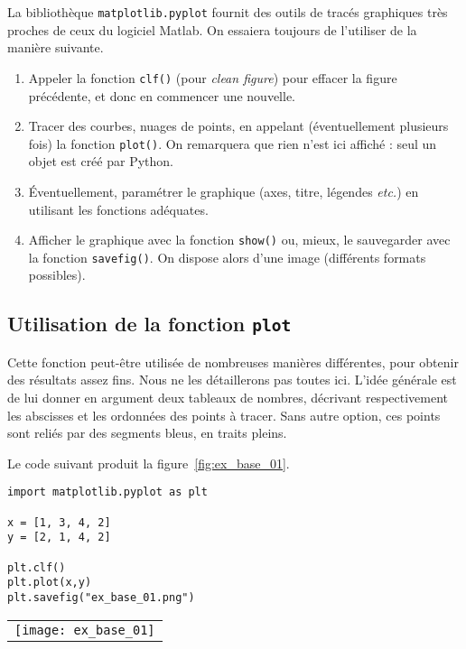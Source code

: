 La bibliothèque \texttt{matplotlib.pyplot} fournit des outils de tracés graphiques très proches de ceux du logiciel Matlab. 
On essaiera toujours de l'utiliser de la manière suivante. 
\begin{enumerate}
  \item Appeler la fonction \texttt{clf()} (pour \emph{clean figure}) pour effacer la figure précédente, et donc en commencer une nouvelle. 
  \item Tracer des courbes, nuages de points, en appelant (éventuellement plusieurs fois) la fonction \texttt{plot()}. On remarquera que rien n'est ici affiché : seul un objet est créé par Python. 
  \item Éventuellement, paramétrer le graphique (axes, titre, légendes \emph{etc.}) en utilisant les fonctions adéquates. 
  \item Afficher le graphique avec la fonction \texttt{show()} ou, mieux, le sauvegarder avec la fonction \texttt{savefig()}. On dispose alors d'une image (différents formats possibles). 
\end{enumerate}

\subsection{Utilisation de la fonction \texttt{plot}}

Cette fonction peut-être utilisée de nombreuses manières différentes, pour obtenir des résultats assez fins. Nous ne les 
détaillerons pas toutes ici. 
L'idée générale est de lui donner en argument deux tableaux de nombres, décrivant respectivement les abscisses et les ordonnées des points à tracer. 
Sans autre option, ces points sont reliés par des segments bleus, en traits pleins. 
\begin{exemple}
  Le code suivant produit la figure~\ref{fig:ex_base_01}.
\begin{lstlisting}
import matplotlib.pyplot as plt

x = [1, 3, 4, 2]
y = [2, 1, 4, 2]

plt.clf()
plt.plot(x,y)
plt.savefig("ex_base_01.png")
\end{lstlisting}


  \begin{center}
  \begin{tabular}{c}
    \texttt{[image: ex\_base\_01]} \\
    \end{tabular}
    \label{fig:ex_base_01}
  \end{center}
\end{exemple}

